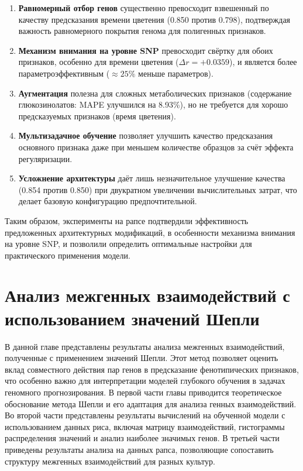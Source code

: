 \begin{enumerate}
	\item \textbf{Равномерный отбор генов} существенно превосходит 
	взвешенный по качеству предсказания времени цветения (0.850 
	против 0.798), подтверждая важность равномерного покрытия 
	генома для полигенных признаков.
	
	\item \textbf{Механизм внимания на уровне SNP} превосходит свёртку 
	для обоих признаков, особенно для времени цветения ($\Delta r = 
	+0.0359$), и является более параметроэффективным ($\approx 25\%$ 
	меньше параметров).
	
	\item \textbf{Аугментация} полезна для сложных метаболических 
	признаков (содержание глюкозинолатов: MAPE улучшился на 8.93\%), 
	но не требуется для хорошо предсказуемых признаков (время 
	цветения).
	
	\item \textbf{Мультизадачное обучение} позволяет улучшить качество 
	предсказания основного признака даже при меньшем количестве 
	образцов за счёт эффекта регуляризации.
	
	\item \textbf{Усложнение архитектуры} даёт лишь незначительное 
	улучшение качества (0.854 против 0.850) при двукратном 
	увеличении вычислительных затрат, что делает базовую 
	конфигурацию предпочтительной.
\end{enumerate}

Таким образом, эксперименты на рапсе подтвердили эффективность 
предложенных архитектурных модификаций, в особенности механизма 
внимания на уровне SNP, и позволили определить оптимальные настройки 
для практического применения модели.

\chapter{Анализ межгенных взаимодействий с использованием значений Шепли} \label{ch3}

\noindent
В данной главе представлены результаты анализа межгенных взаимодействий, 
полученные с применением значений Шепли. Этот метод позволяет оценить 
вклад совместного действия пар генов в предсказание фенотипических 
признаков, что особенно важно для интерпретации моделей глубокого 
обучения в задачах геномного прогнозирования. В первой части главы 
приводится теоретическое обоснование метода Шепли и его адаптация 
для анализа генных взаимодействий. Во второй части представлены 
результаты вычислений на обученной модели с использованием данных 
риса, включая матрицу взаимодействий, гистограммы распределения 
значений и анализ наиболее значимых генов. В третьей части приведены 
результаты анализа на данных рапса, позволяющие сопоставить структуру 
межгенных взаимодействий для разных культур.

